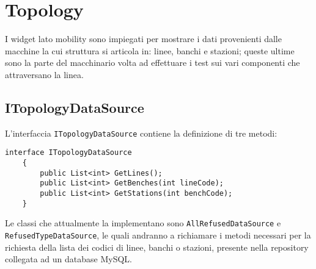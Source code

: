 \chapter{Topology}
\label{chap:topology}
I widget lato mobility sono impiegati per mostrare i dati provenienti dalle macchine la cui struttura si articola in: linee, banchi e stazioni; queste ultime sono la parte del macchinario volta ad effettuare i test sui vari componenti che attraversano la linea.

\section{ITopologyDataSource}
L'interfaccia \verb|ITopologyDataSource| contiene la definizione di tre metodi:
\\
\begin{lstlisting}[caption={TopologyController.cs}, style=javaScriptCode, label={lst:cacheattribute}]
    interface ITopologyDataSource
    {
        public List<int> GetLines();
        public List<int> GetBenches(int lineCode);
        public List<int> GetStations(int benchCode);
    }
\end{lstlisting}
Le classi che attualmente la implementano sono \verb|AllRefusedDataSource| e\\ \verb|RefusedTypeDataSource|, le quali andranno a richiamare i metodi necessari per la richiesta della lista dei codici di linee, banchi o stazioni, presente nella repository collegata ad un database MySQL.

